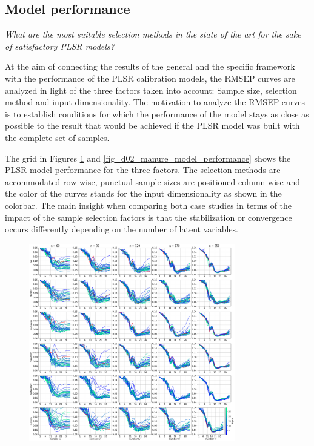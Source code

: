 \documentclass[journal=ancham,manuscript=article]{achemso}
\begin{document}
\subsection*{Model performance}\label{results:modperformance}


\emph{What are the most suitable selection methods in the state of the art for the sake of satisfactory PLSR models?}

At the aim of connecting the results of the general and the specific framework with the performance of the PLSR calibration models, the RMSEP curves are analyzed in light of the three factors taken into account: Sample size, selection method and input dimensionality. The motivation to analyze the RMSEP curves is to establish conditions for which the performance of the model stays as close as possible to the result that would be achieved if the PLSR model was built with the complete set of samples. 

The grid in Figures \ref{fig_d01_milk_model_performance} and \ref{fig_d02_manure_model_performance} shows the PLSR model performance for the three factors. The selection methods are accommodated row-wise, punctual sample sizes are positioned column-wise and the color of the curves stands for the input dimensionality as shown in the colorbar. The main insight when comparing both case studies in terms of the impact of the sample selection factors is that the stabilization or convergence occurs differently depending on the number of latent variables. 


\begin{figure}[b]
\includegraphics[width=0.8\textwidth]{manuscript/figures/d01_milk_model_performance.png}
\centering
\caption{}
\label{fig_d01_milk_model_performance}
\end{figure}
\end{document}
